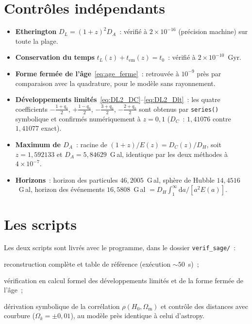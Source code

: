 \documentclass[11pt,a4paper,openany]{report}
\newcommand{\dif}{\mathrm{d}}
\newcommand{\Hzero}{H_{0}}
\newcommand{\Om}{\Omega_{\mathrm{m}}}
\newcommand{\Ok}{\Omega_{k}}
\begin{document}
\section{Contrôles indépendants}

\begin{itemize}[topsep=3pt]
\item \textbf{Etherington} $D_{L} = (1+z)^{2}D_{A}$~: vérifié à
$2\times10^{-16}$ (précision machine) sur toute la plage.
\item \textbf{Conservation du temps} $t_{L}(z) + t_{\text{em}}(z) = t_{0}$~:
vérifié à $2\times10^{-10}$~Gyr.
\item \textbf{Forme fermée de l'âge}~\eqref{eq:age_ferme}~: retrouvée à
$10^{-9}$ près par comparaison avec la quadrature, pour le modèle sans
rayonnement.
\item \textbf{Développements limités}~\eqref{eq:DL2_DC}--\eqref{eq:DL2_Dlt}~:
les quatre coefficients $-\tfrac{1+q_{0}}{2}$, $+\tfrac{1-q_{0}}{2}$,
$-\tfrac{3+q_{0}}{2}$, $-\tfrac{2+q_{0}}{2}$ sont obtenus par
\texttt{series()} symbolique et confirmés numériquement à $z=0{,}1$
($D_{C}$~: $1{,}41076$ contre $1{,}41077$ exact).
\item \textbf{Maximum de $D_{A}$}~: racine de $(1+z)/E(z) = D_{C}(z)/D_{H}$,
soit $z = 1{,}592133$ et $D_{A} = 5{,}84629$~G\,al, identique par les deux
méthodes à $4\times10^{-7}$.
\item \textbf{Horizons}~: horizon des particules $46{,}2005$~G\,al, sphère de
Hubble $14{,}4516$~G\,al, horizon des événements $16{,}5808$~G\,al
$= D_{H}\int_{1}^{\infty} \dif a/[a^{2}E(a)]$.
\end{itemize}

\section{Les scripts}

Les deux scripts sont livrés avec le programme, dans le dossier
\texttt{verif\_sage/}~:

\begin{description}[leftmargin=3.4cm,labelwidth=3.2cm]
\item[\texttt{verif\_cosmo.sage}] reconstruction complète et table de
référence (exécution $\sim 50$~s)~;
\item[\texttt{verif\_DL\_symbolique.sage}] vérification en calcul formel des
développements limités et de la forme fermée de l'âge~;
\item[\texttt{verif\_courbure\_sigma.sage}] dérivation symbolique de la
corrélation $\rho(\Hzero,\Om)$ et contrôle des distances avec courbure
($\Ok = \pm0{,}01$), au modèle près identique à celui d'astropy.
\end{description}
\end{document}
